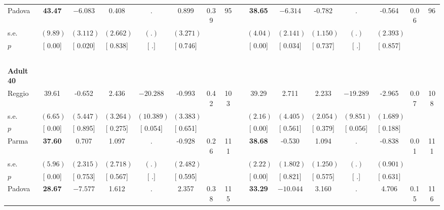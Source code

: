 \begin{longtable}{L{8em} c c c c c c c p{1em} c c c c c c c}
\quad \quad \quad Padova& \textbf{    43.47} & $ \mathbf{   -6.083}$ &     0.408 &         . &     0.899 &      0.39 &        95 & & \textbf{    38.65} & $ \mathbf{   -6.314}$ &    -0.782 &         . &    -0.564 &      0.06 &        96  \\*
\quad \quad \quad \quad s.e.& $ (     9.89)$ & $ (    3.112)$ & $ (    2.662)$ & $ (        .)$ & $ (    3.271)$ & & & & $ (     4.04)$ & $ (    2.141)$ & $ (    1.150)$ & $ (        .)$ & $ (    2.393)$ & &  \\*
\quad \quad \quad \quad $ p$ & [     0.00] & [    0.020] & [    0.838] & [        .] & [    0.746] & & & & [     0.00] & [    0.034] & [    0.737] & [        .] & [    0.857] & &  \\[1em]
~\\[1em]
\quad \quad \textbf{Adult 40} & & & & & & & & & & & & & & & \\* 
\quad \quad \quad Reggio& 39.61 &    -0.652 &     2.436 & $ \mathbf{  -20.288}$ &    -0.993 &      0.42 &       103 & & 39.29 &     2.711 &     2.233 & $ \mathbf{  -19.289}$ &    -2.965 &      0.07 &       108  \\*
\quad \quad \quad \quad s.e.& $ (     6.65)$ & $ (    5.447)$ & $ (    3.264)$ & $ (   10.389)$ & $ (    3.383)$ & & & & $ (     2.16)$ & $ (    4.405)$ & $ (    2.054)$ & $ (    9.851)$ & $ (    1.689)$ & &  \\*
\quad \quad \quad \quad $ p$ & [     0.00] & [    0.895] & [    0.275] & [    0.054] & [    0.651] & & & & [     0.00] & [    0.561] & [    0.379] & [    0.056] & [    0.188] & &  \\[1em]
\quad \quad \quad Parma& \textbf{    37.60} &     0.707 &     1.097 &         . &    -0.928 &      0.26 &       111 & & \textbf{    38.68} &    -0.530 &     1.094 &         . &    -0.838 &      0.01 &       111  \\*
\quad \quad \quad \quad s.e.& $ (     5.96)$ & $ (    2.315)$ & $ (    2.718)$ & $ (        .)$ & $ (    2.482)$ & & & & $ (     2.22)$ & $ (    1.802)$ & $ (    1.250)$ & $ (        .)$ & $ (    0.901)$ & &  \\*
\quad \quad \quad \quad $ p$ & [     0.00] & [    0.753] & [    0.567] & [        .] & [    0.595] & & & & [     0.00] & [    0.821] & [    0.575] & [        .] & [    0.631] & &  \\[1em]
\quad \quad \quad Padova& \textbf{    28.67} & $ \mathbf{   -7.577}$ &     1.612 &         . &     2.357 &      0.38 &       115 & & \textbf{    33.29} & $ \mathbf{  -10.044}$ &     3.160 &         . &     4.706 &      0.15 &       116  \\*

\end{longtable}
